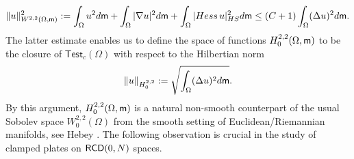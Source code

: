 \documentclass[11pt, reqno]{amsart}
\numberwithin{equation}{section}
\begin{document}
	\begin{equation}\label{eq:HessuL2}
		\|u\|_{W^{2,2}(\Omega,{\sf m})}^2:=	\int_\Omega  u^2 {\rm d}{\sf m}+\int_\Omega  |\nabla u|^2 {\rm d}{\sf m}+\int_\Omega |\textrm{Hess}\, u|^2_{\rm HS} {\rm d}{\sf m} 	\leq (C+1) \int_\Omega  (\Delta u)^2 {\rm d}{\sf m}.
	\end{equation}
	The latter estimate enables us to define the space of functions $H^{2,2}_0(\Omega,{\sf m})$ to be the closure of $\mathsf{Test}_c(\Omega)$ with respect to	the Hilbertian norm
	$$
	\|u\|_{H^{2,2}_0}:= \sqrt{\int_{\Omega} (\Delta u)^2 {\rm d}{\sf m}}.
	$$
	By this argument,  $H^{2,2}_0(\Omega,{\sf m})$ is a natural non-smooth counterpart of the usual Sobolev space $W_0^{2,2}(\Omega)$ from the smooth setting of Euclidean/Riemannian manifolds, see Hebey \cite[Proposition 3.3]{Hebey}. The following observation is crucial in the study of clamped plates on ${\sf RCD}(0,N)$ spaces. 
	
\end{document}
